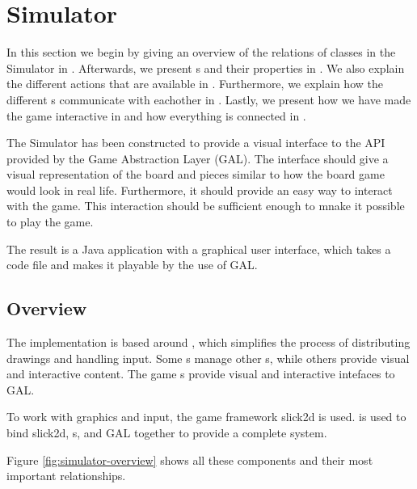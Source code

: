 \section{Simulator}

In this section we begin by giving an overview of the relations of classes in
the Simulator in . Afterwards, we present
s and their properties in . We also explain
the different actions that are available in . Furthermore,
we explain how the different s communicate with eachother in
. Lastly, we present how we have made the game
interactive in  and how everything is connected in
.


The Simulator has been constructed to provide a visual interface to the API
provided by the Game Abstraction Layer (GAL). The interface should give a visual
representation of the board and pieces similar to how the board game would look
in real life. Furthermore, it should provide an easy way to interact with the
game. This interaction should be sufficient enough to mnake it possible to play
the game.

The result is a Java application with a graphical user interface, which takes a
\productname code file and makes it playable by the use of GAL.

\subsection{Overview}
\label{sec:overview}

The implementation is based around , which simplifies the
process of distributing drawings and handling input. Some s
manage other s, while others provide visual and interactive
content. The game s provide visual and interactive intefaces to
GAL.

To work with graphics and input, the game framework slick2d is used.
 is used to bind slick2d, s, and GAL
together to provide a complete system.

Figure \ref{fig:simulator-overview} shows all these components and their most
important relationships.



